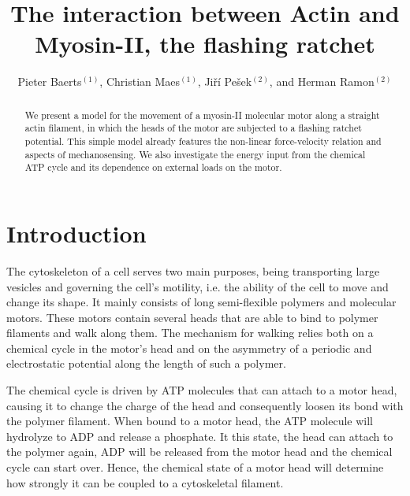 \documentclass[aps,pre,twocolumn,showpacs,showkeys,a4paper]{revtex4}
\begin{document}
 

\title{The interaction between Actin and Myosin-II, the flashing ratchet}
\author{Pieter Baerts$^{(1)}$, Christian Maes$^{(1)}$, Jiří Pešek$^{(2)}$, and Herman Ramon$^{(2)}$}
\begin{abstract}
We present a model for the movement of a myosin-II molecular motor along a straight actin filament, in which the heads of the motor are subjected to a flashing ratchet potential. This simple model already features the non-linear force-velocity relation and aspects of mechanosensing. We also investigate the energy input from the chemical ATP cycle and its dependence on external loads on the motor.  
\end{abstract}

\maketitle 

\section{Introduction}

The cytoskeleton of a cell serves two main purposes, being transporting large vesicles and governing the cell's motility, i.e. the ability of the cell to move and change its shape. 
It mainly consists of long semi-flexible polymers and molecular motors. 
These motors contain several heads that are able to bind to polymer filaments and walk along them. 
The mechanism for walking relies both on a chemical cycle in the motor's head and on the asymmetry of a periodic and electrostatic potential along the length of such a polymer.


The chemical cycle is driven by ATP molecules that can attach to a motor head, causing it to change the charge of the head and consequently loosen its bond with the polymer filament. 
When bound to a motor head, the ATP molecule will hydrolyze to ADP and release a phosphate. 
It this state, the head can attach to the polymer again, ADP will be released from the motor head and the chemical cycle can start over. 
Hence, the chemical state of a motor head will determine how strongly it can be coupled to a cytoskeletal filament. 
\end{document}
